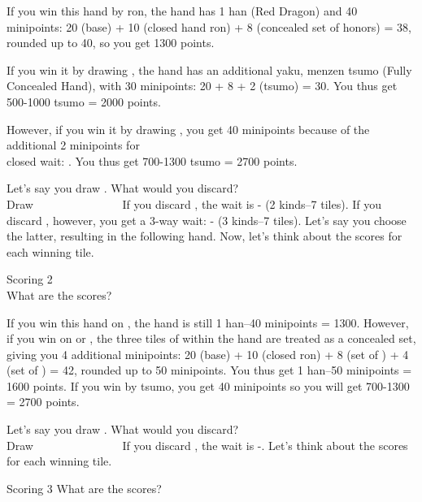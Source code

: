 \bigskip
\noindent If you win this hand by {\jap ron}, the hand has 1 {\jap han} (Red Dragon) and 40 minipoints: 20 (base) + 10 (closed hand {\jap ron}) + 8 (concealed set of honors) = 38, rounded up to 40, so you get 1300 points. 

\bigskip
If you win it by drawing {\LARGE{}}, the hand has an additional {\jap yaku}, {\jap menzen tsumo} (Fully Concealed Hand), with 30 minipoints: 20 + 8 + 2 ({\jap tsumo}) = 30. You thus get 500-1000 {\jap tsumo} = 2000 points. 

\bigskip
However, if you win it by drawing {\LARGE{}}, you get 40 minipoints because of the additional 2 minipoints for \\closed wait: {\LARGE{}}. You thus get 700-1300 {\jap tsumo} = 2700 points.

\bigskip

Let's say you draw {\LARGE{}}. What would you discard?
\bp
{}\zhong\zhong\zhong~\\
\hfill\footnotesize{Draw~~~~~~~~~~~~~~~}
\ep
If you discard {\LARGE{}}, the wait is {\LARGE{}-} (2 kinds--7 tiles). If you discard {\LARGE{}}, however, you get a 3-way wait: {\LARGE{}- } (3 kinds--7 tiles). Let's say you choose the latter, resulting in the following hand. Now, let's think about the scores for each winning tile. 

\begin{itembox}[r]{Scoring 2}
\bp
{}\zhong\zhong\zhong\\
\ep
\vspace{-10pt} What are the scores?
\end{itembox}

\bigskip
\noindent If you win this hand on {\LARGE{}}, the hand is still 1 {\jap han}--40 minipoints = 1300. However, if you win on {\LARGE{}} or {\LARGE{}}, the three tiles of {\LARGE{}} within the hand are treated as a concealed set, giving you 4 additional minipoints: 20 (base) + 10 (closed {\jap ron}) + 8 (set of \zhong) + 4 (set of ) = 42, rounded up to 50 minipoints. You thus get 1 {\jap han}--50 minipoints = 1600 points. If you win by {\jap tsumo}, you get 40 minipoints so you will get 700-1300 = 2700 points. 

\bigskip

Let's say you draw {\LARGE{}}. What would you discard? 
\bp
{}\zhong\zhong\zhong~\\
\hfill\footnotesize{Draw~~~~~~~~~~~~~~~}
\ep
If you discard {\LARGE{}}, the wait is {\LARGE{}-}. Let's think about the scores for each winning tile. 
\begin{itembox}[r]{Scoring 3}
\bp
{}\zhong\zhong\zhong
\ep
\vspace{-10pt} What are the scores?
\end{itembox}

